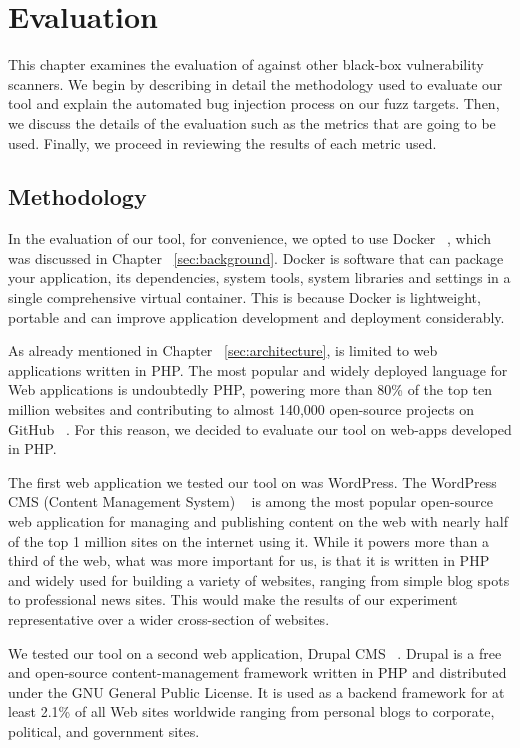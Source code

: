 \chapter{Evaluation}
\label{sec:evaluation}
\minitoc
\vspace*{1cm}

This chapter examines the evaluation of \pname{} against other black-box vulnerability scanners. We begin by describing in detail the methodology used to evaluate our tool and explain the automated bug injection process on our fuzz targets. Then, we discuss the details of the evaluation such as the metrics that are going to be used. Finally, we proceed in reviewing the results of each metric used.

\section{Methodology}
\label{sec:dockerStack}
In the evaluation of our tool, for convenience, we opted to use Docker ~\cite{docker_def}, which was discussed in Chapter ~\ref{sec:background}. Docker is software that can package your application, its dependencies, system tools, system libraries and settings in a single comprehensive virtual container. This is because Docker is lightweight, portable and can improve application development and deployment considerably.

As already mentioned in Chapter ~\ref{sec:architecture}, \pname{} is limited to web applications written in PHP. The most popular and widely deployed language for Web applications is undoubtedly PHP, powering more than 80\% of the top ten million websites and contributing to almost 140,000 open-source projects on GitHub ~\cite{githubinfo}. For this reason, we decided to evaluate our tool on web-apps developed in PHP.

The first web application we tested our tool on was WordPress. The WordPress CMS (Content Management System) ~\cite{docker_def} is among the most popular open-source web application for managing and publishing content on the web with nearly half of the top 1 million sites on the internet using it. While it powers more than a third of the web, what was more important for us, is that it is written in PHP and widely used for building a variety of websites, ranging from simple blog spots to professional news sites. This would make the results of our experiment representative over a wider cross-section of websites.

We tested our tool on a second web application, Drupal CMS ~\cite{drupal}. Drupal is a free and open-source content-management framework written in PHP and distributed under the GNU General Public License. It is used as a backend framework for at least 2.1\% of all Web sites worldwide ranging from personal blogs to corporate, political, and government sites.

